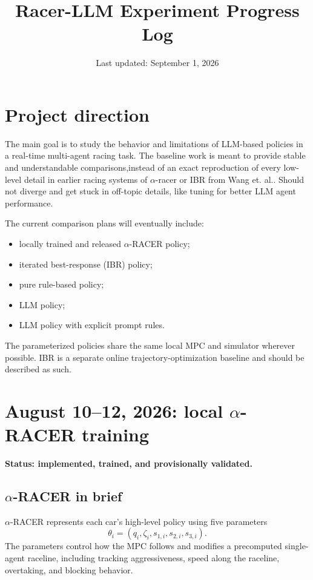 \documentclass[11pt]{article}
\title{Racer-LLM Experiment Progress Log}
\author{}
\date{Last updated: September 1, 2026}
\newcommand{\status}[1]{\textcolor{blue!65!black}{\textbf{#1}}}
\begin{document}
\maketitle

\section{Project direction}

The main goal is to study the behavior and limitations of LLM-based policies in
a real-time multi-agent racing task. The baseline work is meant to provide
stable and understandable comparisons,instead of an exact
reproduction of every low-level detail in earlier racing systems of $\alpha$-racer or IBR from Wang et. al.. Should not diverge and get stuck in off-topic details, like tuning for better LLM agent performance.

The current comparison plans will eventually include:
\begin{itemize}
  \item locally trained and released $\alpha$-RACER policy;
  \item iterated best-response (IBR) policy;
  \item pure rule-based policy;
  \item LLM policy;
  \item LLM policy with explicit prompt rules.
\end{itemize}

The parameterized policies share the same local MPC and simulator wherever
possible. IBR is a separate online trajectory-optimization baseline and should
be described as such.

\section{August 10--12, 2026: local $\alpha$-RACER training}

\status{Status: implemented, trained, and provisionally validated.}

\subsection{$\alpha$-RACER in brief}

$\alpha$-RACER represents each car's high-level policy using five parameters
\[
  \theta_i=(q_i,\zeta_i,s_{1,i},s_{2,i},s_{3,i}).
\]
The parameters control how the MPC follows and modifies a precomputed
single-agent raceline, including tracking aggressiveness, speed along the
raceline, overtaking, and blocking behavior.
\end{document}
